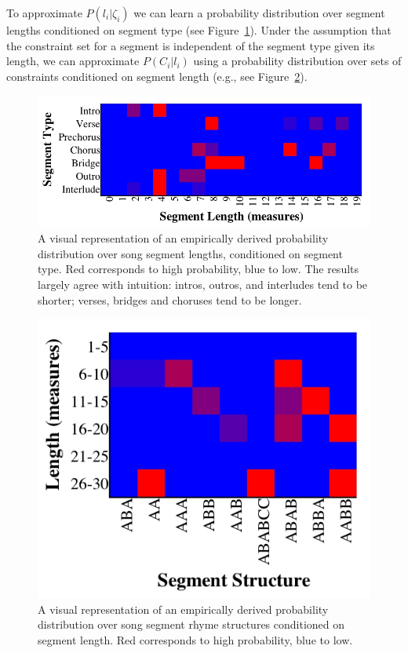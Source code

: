 \documentclass[phd,electronic,oneside,twosidetoc,letterpaper,chaptercenter,parttop,lol,lof,lot]{byumsphd}
\begin{document}
To approximate $P(l_i|\zeta_i)$ we can learn a probability distribution over segment lengths conditioned on segment type (see Figure~\ref{fig:measure_count_by_segment}). Under the assumption that the constraint set for a segment is independent of the segment type given its length, we can approximate $P(C_i | l_i)$ using a probability distribution over sets of constraints conditioned on segment length (e.g., see Figure~\ref{fig:segment_structure}).

\begin{figure}
	\centering
	\includegraphics[width=\linewidth]{measure_count_by_segment}
	\caption{\label{fig:measure_count_by_segment} A visual representation of an empirically derived probability distribution over song segment lengths, conditioned on segment type. Red corresponds to high probability, blue to low. The results largely agree with intuition: intros, outros, and interludes tend to be shorter; verses, bridges and choruses tend to be longer.}
\end{figure}

\begin{figure}
	\centering
	\includegraphics[width=.7\linewidth]{segment_structure}
	\caption{\label{fig:segment_structure} A visual representation of an empirically derived probability distribution over song segment rhyme structures conditioned on segment length. Red corresponds to high probability, blue to low.}
\end{figure}
\end{document}
